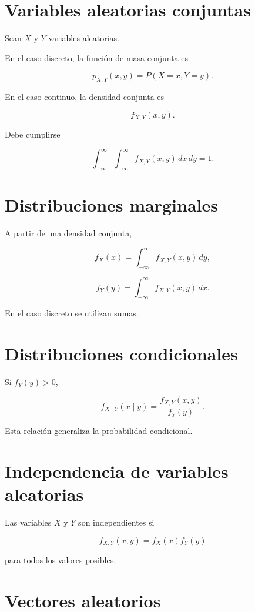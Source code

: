\documentclass[
  spanish,
  11pt,
  letterpaper,
  DIV=11,
  numbers=noendperiod]{scrreprt}
\theoremstyle{definition}
\theoremstyle{plain}
\theoremstyle{definition}
\theoremstyle{remark}
\begin{document}
\section{Variables aleatorias
conjuntas}\label{variables-aleatorias-conjuntas}

Sean \(X\) y \(Y\) variables aleatorias.

En el caso discreto, la función de masa conjunta es

\[
p_{X,Y}(x,y)
=
P(X=x,Y=y).
\]

En el caso continuo, la densidad conjunta es

\[
f_{X,Y}(x,y).
\]

Debe cumplirse

\[
\int_{-\infty}^{\infty}
\int_{-\infty}^{\infty}
f_{X,Y}(x,y)\,dx\,dy
=
1.
\]

\section{Distribuciones marginales}\label{distribuciones-marginales}

A partir de una densidad conjunta,

\[
f_X(x)
=
\int_{-\infty}^{\infty}
f_{X,Y}(x,y)\,dy,
\]

\[
f_Y(y)
=
\int_{-\infty}^{\infty}
f_{X,Y}(x,y)\,dx.
\]

En el caso discreto se utilizan sumas.

\section{Distribuciones
condicionales}\label{distribuciones-condicionales}

Si \(f_Y(y)>0\),

\[
f_{X\mid Y}(x\mid y)
=
\frac{
f_{X,Y}(x,y)
}{
f_Y(y)
}.
\]

Esta relación generaliza la probabilidad condicional.

\section{Independencia de variables
aleatorias}\label{independencia-de-variables-aleatorias}

Las variables \(X\) y \(Y\) son independientes si

\[
f_{X,Y}(x,y)
=
f_X(x)f_Y(y)
\]

para todos los valores posibles.

\section{Vectores aleatorios}\label{vectores-aleatorios}
\end{document}
